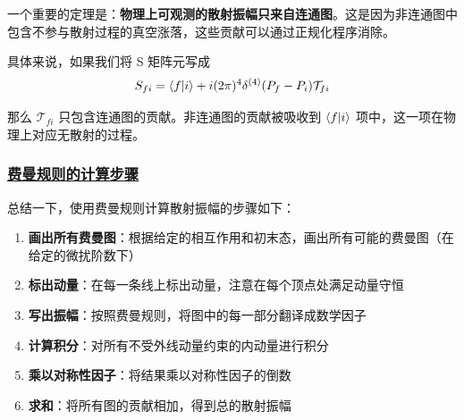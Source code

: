 一个重要的定理是：\textbf{物理上可观测的散射振幅只来自连通图}。这是因为非连通图中包含不参与散射过程的真空涨落，这些贡献可以通过正规化程序消除。

具体来说，如果我们将 S 矩阵元写成
\begin{equation*}
    S_{fi} = \braket{f}{i} + i(2\pi)^4\delta^{(4)}(P_f - P_i)\mathcal{T}_{fi}
\end{equation*}

那么 $\mathcal{T}_{fi}$ 只包含连通图的贡献。非连通图的贡献被吸收到 $\braket{f}{i}$ 项中，这一项在物理上对应无散射的过程。

\subsubsection{\protect\hyperlink{:}{费曼规则的计算步骤}}

总结一下，使用费曼规则计算散射振幅的步骤如下：

\begin{enumerate}
    \item \textbf{画出所有费曼图}：根据给定的相互作用和初末态，画出所有可能的费曼图（在给定的微扰阶数下）
    \item \textbf{标出动量}：在每一条线上标出动量，注意在每个顶点处满足动量守恒
    \item \textbf{写出振幅}：按照费曼规则，将图中的每一部分翻译成数学因子
    \item \textbf{计算积分}：对所有不受外线动量约束的内动量进行积分
    \item \textbf{乘以对称性因子}：将结果乘以对称性因子的倒数
    \item \textbf{求和}：将所有图的贡献相加，得到总的散射振幅
\end{enumerate}

